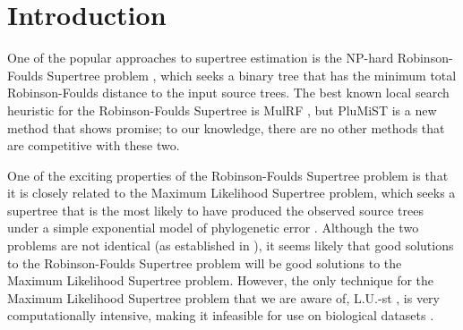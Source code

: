 
\section{Introduction}



One of the popular approaches to supertree estimation is the
NP-hard
Robinson-Foulds Supertree problem \cite{bansal2010robinson}, which 
seeks a binary tree that has the minimum total Robinson-Foulds
\cite{RF} distance to the input source trees.
The best known local search 
heuristic for the Robinson-Foulds Supertree
is MulRF \cite{mulrf}, but
PluMiST \cite{plumist} is a new method that
shows promise; 
to our knowledge, there are no
other methods that are competitive with these two.

One of the exciting properties of the
Robinson-Foulds Supertree problem is that it is closely
related to  the Maximum Likelihood Supertree problem,
which seeks a supertree that is the most likely to
have produced the observed source trees under a simple
exponential
model of phylogenetic error \cite{ml-supertree}.
Although the two problems are not identical
(as established in \cite{BryantSteel2009}),
it seems likely that 
good solutions to the
Robinson-Foulds Supertree problem will 
be good solutions to the Maximum 
Likelihood Supertree problem. 
However, 
the only technique for
the Maximum Likelihood Supertree problem that we are
aware of,  L.U.-st \cite{Akanni-MLsupertree},
is very computationally intensive, making it
infeasible for use
on biological datasets \cite{Akanni-Bayesian}.

